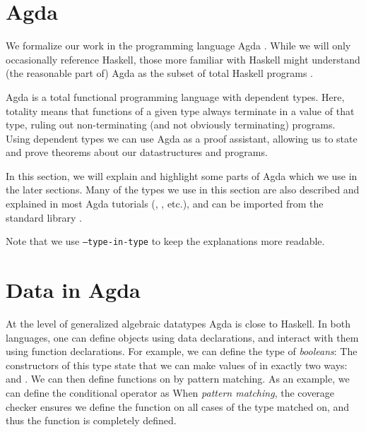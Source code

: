 \section{Agda}\label{sec:background-agda}
We formalize our work in the programming language Agda \cite{agda}. While we will only occasionally reference Haskell, those more familiar with Haskell might understand (the reasonable part of) Agda as the subset of total Haskell programs \cite{agda2hs}.

Agda is a total functional programming language with dependent types. Here, totality means that functions of a given type always terminate in a value of that type, ruling out non-terminating (and not obviously terminating) programs. Using dependent types we can use Agda as a proof assistant, allowing us to state and prove theorems about our datastructures and programs. 

In this section, we will explain and highlight some parts of Agda which we use in the later sections. 
Many of the types we use in this section are also described and explained in most Agda tutorials (\cite{ulftutorial}, \cite{plfa}, etc.), and can be imported from the standard library \cite{agdastdlib}.

Note that we use \texttt{--type-in-type} to keep the explanations more readable. 


\section{Data in Agda}\label{sec:background-data}
At the level of generalized algebraic datatypes Agda is close to Haskell. In both languages, one can define objects using data declarations, and interact with them using function declarations. For example, we can define the type of \emph{booleans}:
The constructors of this type state that we can make values of  in exactly two ways:  and . We can then define functions on  by pattern matching. As an example, we can define the conditional operator as
When \emph{pattern matching}, the coverage checker ensures we define the function on all cases of the type matched on, and thus the function is completely defined. %

